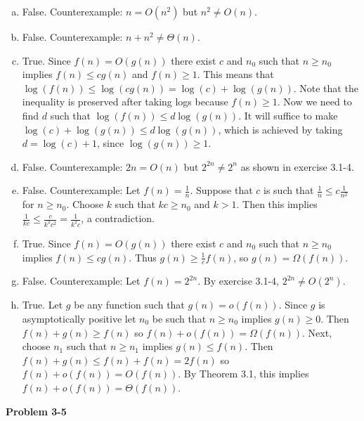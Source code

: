 \documentclass{article}
\begin{document}
\begin{enumerate}[a.]
\item False.  Counterexample: $n = O(n^2)$ but $n^2 \neq O(n)$. \\

\item False.  Counterexample: $n + n^2 \neq \Theta(n)$. \\

\item True.  Since $f(n) = O(g(n))$ there exist $c$ and $n_0$ such that $n \geq n_0$ implies $f(n) \leq cg(n)$ and $f(n) \geq 1$.  This means that $\log(f(n)) \leq \log(cg(n)) = \log(c) + \log(g(n))$.  Note that the inequality is preserved after taking logs because $f(n) \geq 1$.  Now we need to find $d$ such that $\log(f(n)) \leq d\log(g(n))$.  It will suffice to make $\log(c) + \log(g(n)) \leq d\log(g(n))$, which is achieved by taking $d = \log(c) + 1$, since $\log(g(n)) \geq 1$.\\

\item False.  Counterexample: $2n = O(n)$ but $2^{2n} \neq 2^{n}$ as shown in exercise 3.1-4. \\

\item False.  Counterexample: Let $f(n) = \frac{1}{n}$. Suppose that $c$ is such that $\frac{1}{n} \leq c \frac{1}{n^2}$ for $n \geq n_0$.  Choose $k$ such that $kc \geq n_0$ and $k > 1$.  Then this implies $\frac{1}{kc} \leq \frac{c}{k^2c^2} = \frac{1}{k^2 c}$, a contradiction.  \\

\item True.  Since $f(n) = O(g(n))$ there exist $c$ and $n_0$ such that $n \geq n_0$ implies $f(n) \leq c g(n)$.  Thus $g(n) \geq \frac{1}{c} f(n)$, so $g(n) = \Omega(f(n))$. \\

\item False.  Counterexample: Let $f(n) = 2^{2n}$.  By exercise 3.1-4, $2^{2n} \neq O(2^n)$. \\

\item True.  Let $g$ be any function such that $g(n) = o(f(n))$.  Since $g$ is asymptotically positive let $n_0$ be such that $n \geq n_0$ implies $g(n) \geq 0$.  Then $f(n) + g(n) \geq f(n)$ so $f(n) + o(f(n)) = \Omega(f(n))$.  Next, choose $n_1$ such that $n \geq n_1$ implies $g(n) \leq f(n)$.  Then $f(n) + g(n) \leq f(n) + f(n) = 2f(n)$ so $f(n) + o(f(n)) = O(f(n))$.  By Theorem 3.1, this implies $f(n) + o(f(n)) = \Theta(f(n))$. 
\end{enumerate}
\noindent\textbf{Problem 3-5}\\
\end{document}
